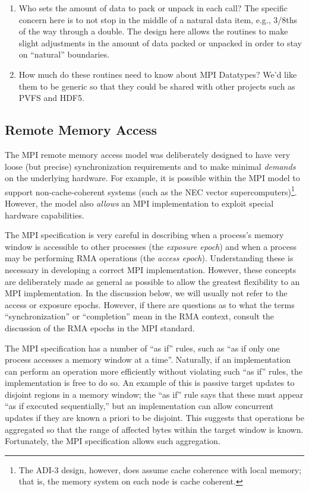 {\begin{enumerate}
\item Who sets the amount of data to pack or unpack in each call?
The specific concern here is to not stop in the middle of a natural
data item, e.g., 3/8ths of the way through a double.  The design here
allows the routines to make slight adjustments in the amount of data
packed or unpacked in order to stay on ``natural'' boundaries.  

\item How much do these routines need to know about MPI Datatypes?
We'd like them to be generic so that they could be shared with other
projects such as PVFS and HDF5.  
\end{enumerate}


\subsection{Remote Memory Access}
\label{sec:rma-design}
The MPI remote memory access model was deliberately designed to have
very loose (but precise) synchronization requirements and to make
minimal \emph{demands} on 
the 
underlying hardware.  For example, it is possible within the MPI model
to support non-cache-coherent systems (such as the NEC vector
supercomputers)\footnote{The ADI-3 design, however, does assume cache
coherence with local memory; that is, the memory system on each node
is cache coherent.}.  However, the model also \emph{allows} an MPI 
implementation to exploit special hardware capabilities.  

%
The MPI specification is very careful in describing when a process's
memory window is accessible to other processes (the \emph{exposure
epoch}) and when a process
may be performing RMA operations (the 
\emph{access epoch}).
Understanding these is necessary in developing 
a correct MPI implementation.  However, these concepts are
deliberately made as general as possible to allow the greatest
flexibility to an MPI implementation.  In the discussion below, we
will usually not refer to the access or exposure epochs.  However, if
there are questions as to what the terms ``synchronization'' or
``completion'' mean in the RMA context, consult the discussion of the
RMA epochs in the MPI standard.

The MPI specification has a number of ``as if'' rules, such as ``as if
only one process accesses a memory window at a time''.  Naturally, if
an implementation can perform an operation more efficiently without
violating such ``as if'' rules, the implementation is free to do so.
An example of this is passive target updates to disjoint regions in a
memory window; 
the ``as if'' rule says that these must appear ``as if executed
sequentially,'' but an implementation can allow concurrent updates if
they are known a priori to be disjoint.  This suggests that operations
be aggregated so that the range of affected bytes within the target
window is known.  Fortunately, the MPI specification allows such aggregation.

}
